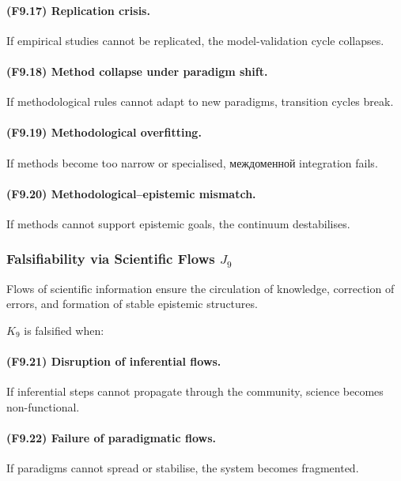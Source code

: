 \paragraph{(F9.17) Replication crisis.}
If empirical studies cannot be replicated,
the model-validation cycle collapses.

\paragraph{(F9.18) Method collapse under paradigm shift.}
If methodological rules cannot adapt to new paradigms,
transition cycles break.

\paragraph{(F9.19) Methodological overfitting.}
If methods become too narrow or specialised,
междоменной integration fails.

\paragraph{(F9.20) Methodological–epistemic mismatch.}
If methods cannot support epistemic goals,
the continuum destabilises.



\subsubsection{Falsifiability via Scientific Flows \texorpdfstring{$J_9$}{J_9}}

Flows of scientific information ensure the circulation of knowledge,
correction of errors, and formation of stable epistemic structures.

$K_9$ is falsified when:

\paragraph{(F9.21) Disruption of inferential flows.}
If inferential steps cannot propagate through the community,
science becomes non-functional.

\paragraph{(F9.22) Failure of paradigmatic flows.}
If paradigms cannot spread or stabilise,
the system becomes fragmented.

